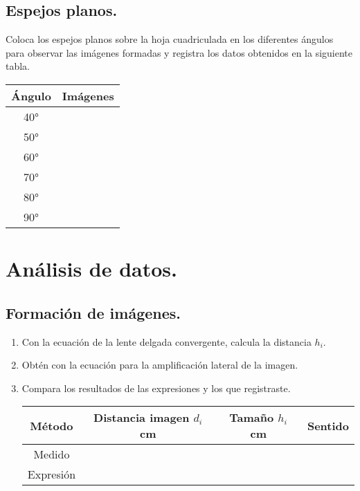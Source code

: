 \documentclass[14pt]{extarticle}
\begin{document}
\subsection{Espejos planos.}

Coloca los espejos planos sobre la hoja cuadriculada en los diferentes ángulos para observar las imágenes formadas y registra los datos obtenidos en la siguiente tabla.
\begin{table}[H]
    \centering
    \begin{tabular}{| c | c |} \hline
    Ángulo & Imágenes \\ \hline
    \ang{40} & \\ \hline
    \ang{50} & \\ \hline
    \ang{60} & \\ \hline
    \ang{70} & \\ \hline
    \ang{80} & \\ \hline
    \ang{90} & \\ \hline
    \end{tabular}
\end{table}

\section{Análisis de datos.}

\subsection{Formación de imágenes.}

\begin{enumerate}
\item Con la ecuación de la lente delgada convergente, calcula la distancia $h_{i}$.
\item Obtén con la ecuación para la amplificación lateral de la imagen.
\item Compara los resultados de las expresiones y los que registraste.
\begin{table}[H]
    \centering
    \begin{tabular}{| c | c | c | c |} \hline
    Método & Distancia imagen $d_{i}$ \unit{\centi\meter} & Tamaño $h_{i}$ \unit{\centi\meter} & Sentido \\ \hline
    Medido & & & \\ \hline
    Expresión & & & \\ \hline
    \end{tabular}
\end{table}
\end{enumerate}
\end{document}
